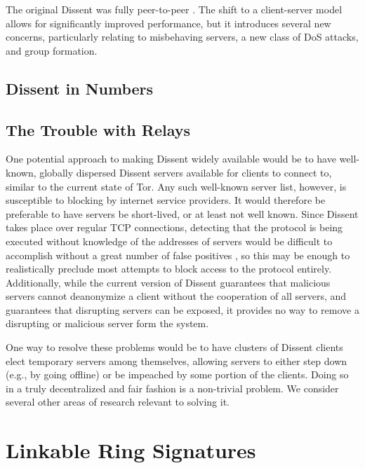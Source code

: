     The original Dissent was fully peer-to-peer
    \cite{corrigan-gibbs_dissent:_2010}. The shift to a client-server model
    allows for significantly improved performance, but it introduces several new
    concerns, particularly relating to misbehaving servers, a new class of DoS
    attacks, and group formation.

  \subsection{Dissent in Numbers}
  \subsection{The Trouble with Relays}
  \label{Subsection:Relays}
    One potential approach to making Dissent widely available would be to have
    well-known, globally dispersed Dissent servers available for clients to
    connect to, similar to the current state of Tor. Any such well-known server
    list, however, is susceptible to blocking by internet service providers. It
    would therefore be preferable to have servers be short-lived, or at least
    not well known. Since Dissent takes place over regular TCP connections,
    detecting that the protocol is being executed without knowledge of the
    addresses of servers would be difficult to accomplish without a great number
    of false positives \cite{houmansadr_parrot_2013}, so this may be enough to
    realistically preclude most attempts to block access to the protocol
    entirely.  Additionally, while the current version of Dissent guarantees
    that malicious servers cannot deanonymize a client without the cooperation
    of all servers, and guarantees that disrupting servers can be exposed, it
    provides no way to remove a disrupting or malicious server form the system.

    One way to resolve these problems would be to have clusters of Dissent
    clients elect temporary servers among themselves, allowing servers to either
    step down (e.g., by going offline) or be impeached by some portion of the
    clients.  Doing so in a truly decentralized and fair fashion is a
    non-trivial problem.  We consider several other areas of research relevant
    to solving it.

\section{Linkable Ring Signatures}
\label{Section:p2p}
